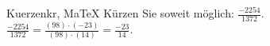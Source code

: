 \begin{MAufgabe}{Kuerzen}{kr, MaTeX}
K\"urzen Sie soweit m\"oglich: $\frac{-2254}{1372}$.\\ 
\ifLsg\MLoesung
\quad $\frac{-2254}{1372}=\frac{(98)\cdot(-23)}{(98)\cdot(14)}=\frac{-23}{14}$.\else\relax\fi
 \end{MAufgabe}
